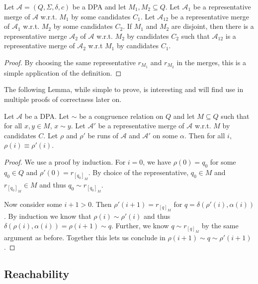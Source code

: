 \begin{lem}
	Let $\mathcal{A} = (Q, \Sigma, \delta, c)$ be a DPA and let $M_1, M_2 \subseteq Q$. Let $\mathcal{A}_1$ be a representative merge of $\mathcal{A}$ w.r.t. $M_1$ by some candidates $C_1$. Let $\mathcal{A}_{12}$ be a representative merge of $\mathcal{A}_1$ w.r.t. $M_2$ by some candidates $C_2$. If $M_1$ and $M_2$ are disjoint, then there is a representative merge $\mathcal{A}_2$ of $\mathcal{A}$ w.r.t. $M_2$ by candidates $C_2$ such that $\mathcal{A}_{12}$ is a representative merge of $\mathcal{A}_2$ w.r.t $M_1$ by candidates $C_1$.
\end{lem}

\begin{proof}
	By choosing the same representative $r_{M_1}$ and $r_{M_2}$ in the merges, this is a simple application of the definition.
\end{proof}

The following Lemma, while simple to prove, is interesting and will find use in multiple proofs of correctness later on.

\begin{lem}
	Let $\mathcal{A}$ be a DPA. Let $\sim$ be a congruence relation on $Q$ and let $M \subseteq Q$ such that for all $x, y \in M$, $x \sim y$. Let $\mathcal{A}'$ be a representative merge of $\mathcal{A}$ w.r.t. $M$ by candidates $C$. Let $\rho$ and $\rho'$ be runs of $\mathcal{A}$ and $\mathcal{A}'$ on some $\alpha$. Then for all $i$, $\rho(i) \equiv \rho'(i)$.
	\label{lem:general:cong_stays_in_merge}
\end{lem}

\begin{proof}
	We use a proof by induction. For $i = 0$, we have $\rho(0) = q_0$ for some $q_0 \in Q$ and $\rho'(0) = r_{[q_0]_M}$. By choice of the representative, $q_0 \in M$ and $r_{[q_0]_M} \in M$ and thus $q_0 \sim r_{[q_0]_M}$.
	
	Now consider some $i+1 > 0$. Then $\rho'(i+1) = r_{[q]_M}$ for $q = \delta(\rho'(i), \alpha(i))$. By induction we know that $\rho(i) \sim \rho'(i)$ and thus $\delta(\rho(i), \alpha(i)) = \rho(i+1) \sim q$. Further, we know $q \sim r_{[q]_M}$ by the same argument as before. Together this lets us conclude in $\rho(i+1) \sim q \sim \rho'(i+1)$.
\end{proof}


\subsection{Reachability}


